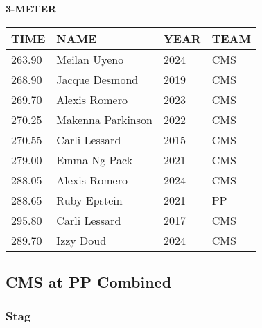 \begin{table}[H]
\centering
\begin{minipage}[t]{0.6\textwidth}
\centering
\textbf{3-METER}\\[0.1cm]
\begin{tabular}{@{}p{1.8cm}p{2.8cm}p{1.2cm}p{1.4cm}@{}}
\hline
    \textbf{TIME} & \textbf{NAME} & \textbf{YEAR} & \textbf{TEAM} \\
\hline
    263.90 & Meilan Uyeno & 2024 & CMS \\
    268.90 & Jacque Desmond & 2019 & CMS \\
    269.70 & Alexis Romero & 2023 & CMS \\
    270.25 & Makenna Parkinson & 2022 & CMS \\
    270.55 & Carli Lessard & 2015 & CMS \\
    279.00 & Emma Ng Pack & 2021 & CMS \\
    288.05 & Alexis Romero & 2024 & CMS \\
    288.65 & Ruby Epstein & 2021 & PP \\
    295.80 & Carli Lessard & 2017 & CMS \\
    289.70 & Izzy Doud & 2024 & CMS \\
\hline
\end{tabular}
\end{minipage}
\end{table}


\newpage

\subsection{CMS at PP Combined}
\subsubsection{Stag}

